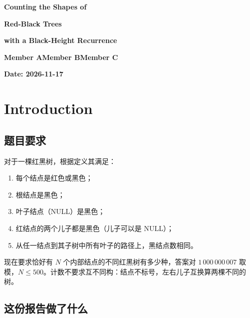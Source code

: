 \documentclass[12pt,a4paper,fontset=windows]{ctexart}
\begin{document}
\begin{titlepage}
\centering
\vspace*{2.0cm}
{\bfseries\fontsize{24}{30}\selectfont Counting the Shapes of\par}
\vspace{0.45em}
{\bfseries\fontsize{24}{30}\selectfont Red-Black Trees\par}
\vspace{0.45em}
{\bfseries\fontsize{24}{30}\selectfont with a Black-Height Recurrence\par}

\vspace{1.6cm}
{\bfseries\fontsize{16}{20}\selectfont Member A\hspace{1.6em}Member B\hspace{1.6em}Member C}

\vspace{1.2cm}
{\bfseries\fontsize{13}{16}\selectfont Date: 2026-11-17}
\end{titlepage}

\section{Introduction}

\subsection{题目要求}

对于一棵红黑树，根据定义其满足：

\begin{enumerate}[leftmargin=1.6em,itemsep=0.15em]
\item 每个结点是红色或黑色；
\item 根结点是黑色；
\item 叶子结点（NULL）是黑色；
\item 红结点的两个儿子都是黑色（儿子可以是 NULL）；
\item 从任一结点到其子树中所有叶子的路径上，黑结点数相同。
\end{enumerate}

现在要求恰好有 $N$ 个内部结点的不同红黑树有多少种，答案对 $1\,000\,000\,007$ 取模，$N\le 500$。计数不要求互不同构：结点不标号，左右儿子互换算两棵不同的树。

\subsection{这份报告做了什么}
\end{document}
